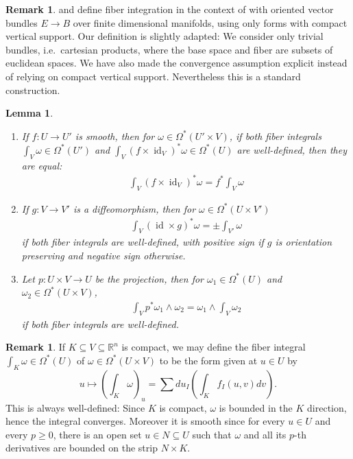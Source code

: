 \documentclass{scrartcl}
\theoremstyle{plain}
\newtheorem{lemma}[theorem]{Lemma}
\theoremstyle{definition}
\newtheorem{remark}[theorem]{Remark}
\newcommand{\R}{\mathbb R}
\renewcommand{\subset}{\subseteq}
\DeclareMathOperator{\id}{id}
\begin{document}
\begin{remark}
    \cite{bott1982differential} and \cite{greub1972connections} define fiber integration in the context of with oriented vector bundles $E\to B$ over finite dimensional manifolds, using only forms with compact vertical support. Our definition is slightly adapted: We consider only trivial bundles, i.e.\ cartesian products, where the base space and fiber are subsets of euclidean spaces. We have also made the convergence assumption explicit instead of relying on compact vertical support. Nevertheless this is a standard construction. 
\end{remark}

\begin{lemma}\label{lem:fiber-int-euclidean}
    \begin{enumerate}
        \item 
    If $f\colon U\to U'$ is smooth, then for $\omega\in \Omega^*(U'\times V)$, if both fiber integrals $\int_V\omega\in\Omega^*(U')$ and $\int_V (f\times\id_V)^*\omega\in\Omega^*(U)$ are well-defined, then they are equal:
    \begin{align*}
        \int_{V} (f\times \id_V)^*\omega = f^*\int_{V}\omega
    \end{align*}
    \item 
    If $g\colon  V\to V'$ is a diffeomorphism, then for $\omega\in \Omega^*(U\times V')$
    \begin{align*}
        \int_V (\id\times g)^*\omega = \pm \int_{V'} \omega
    \end{align*}
    if both fiber integrals are well-defined, with positive sign if $g$ is orientation preserving and negative sign otherwise.
    \item Let $p\colon U\times V\to U$ be the projection, then for $\omega_1\in\Omega^*(U)$ and $\omega_2\in\Omega^*(U\times V)$, 
    \begin{align*}
        \int_V p^*\omega_1 \wedge\omega_2 = \omega_1\wedge\int_V \omega_2
    \end{align*}
    if both fiber integrals are well-defined. 
\end{enumerate}
\end{lemma}


\begin{remark}\label{rmk:fiber-int-cpt}
    If $K\subset V\subset \R^n$ is compact, we may define the fiber integral $\int_K\omega\in \Omega^*(U)$ of $\omega\in\Omega^*(U\times V)$ to be the form given at $u\in U$ by
    $$u\mapsto \left(\int_K \omega\right)_u = \sum du_I \left(\int_K f_{I}(u, v) dv\right).$$
    This is always well-defined: Since $K$ is compact, $\omega$ is bounded in the $K$ direction, hence the integral converges. Moreover it is smooth since for every $u\in U$ and every $p\geq 0$, there is an open set $u\in N\subset U$ such that $\omega$ and all its $p$-th derivatives are bounded on the strip $N\times K$. 
\end{remark}
\end{document}
